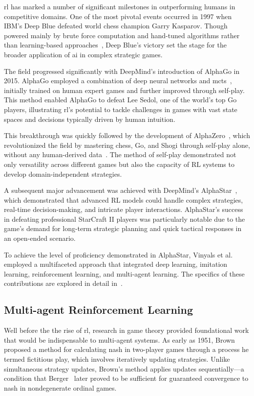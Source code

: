 \Gls{rl} has marked a number of significant milestones in outperforming humans 
in competitive domains. One of the most pivotal events occurred in 1997 
when IBM's Deep Blue defeated world chess champion Garry Kasparov. Though 
powered mainly by brute force computation and hand-tuned algorithms rather than 
learning-based approaches~\cite{campbell2002}, Deep Blue's victory set the 
stage for the broader application of \gls{ai} in complex strategic games.

The field progressed significantly with DeepMind's introduction of AlphaGo 
in 2015. AlphaGo employed a combination of deep neural networks and 
\gls{mcts}~\cite{silver2016}, initially trained on human expert games and 
further improved through self-play.
This method enabled AlphaGo to defeat Lee Sedol, one of the world's top Go 
players, illustrating \gls{rl}'s potential to tackle challenges in games with 
vast state spaces and decisions typically driven by human intuition.

This breakthrough was quickly followed by the development of 
AlphaZero~\cite{silver2017}, which revolutionized the field by mastering chess,
Go, and Shogi through self-play alone, without any human-derived 
data~\cite{silver2017a}. The method of self-play demonstrated not only 
versatility across different games but also the capacity of RL systems to 
develop domain-independent strategies.

A subsequent major advancement was achieved with DeepMind's 
AlphaStar~\cite{vinyals2019}, 
which demonstrated that advanced RL models could handle complex strategies, 
real-time decision-making, and intricate player interactions. 
AlphaStar's success in defeating professional StarCraft II players
was particularly notable due to the game's demand for long-term strategic 
planning and quick tactical responses in an open-ended scenario.

To achieve the level of proficiency demonstrated in AlphaStar, 
Vinyals et al.~\cite{vinyals2019} employed a multifaceted approach 
that integrated deep learning, imitation learning, 
reinforcement learning, and multi-agent learning. 
The specifics of these contributions are explored in detail 
in~.

    \subsection*{Multi-agent Reinforcement Learning}%

Well before the the rise of \gls*{rl}, research in game theory 
provided foundational work that would be indispensable to multi-agent systems.
As early as 1951, Brown~\cite{brown1951iterative} proposed a method for 
calculating \gls{nash} in two-player games through a process he termed 
fictitious play, which involves iteratively updating strategies. 
Unlike simultaneous strategy updates, Brown's method applies updates 
sequentially—a condition that Berger~\cite{berger2005, berger2007} 
later proved to be sufficient for guaranteed convergence to 
\gls{nash} in nondegenerate ordinal games. 

